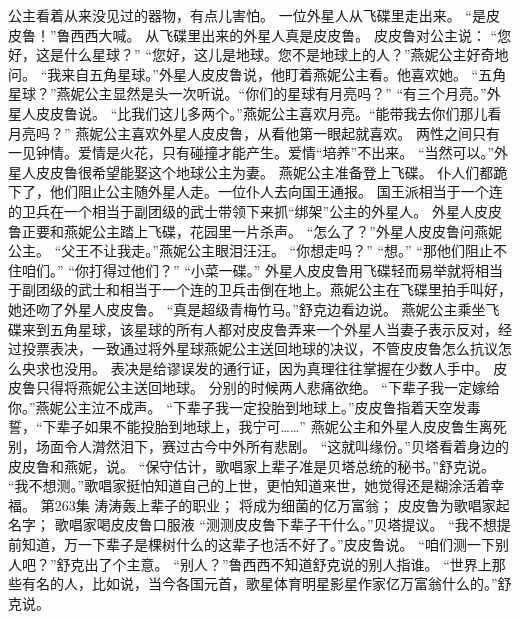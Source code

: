 \documentclass[a4paper,12pt,UTF8,twoside]{ctexbook}
\begin{document}
        公主看着从来没见过的器物，有点儿害怕。  
        一位外星人从飞碟里走出来。  
        “是皮皮鲁！”鲁西西大喊。  
        从飞碟里出来的外星人真是皮皮鲁。  
        皮皮鲁对公主说：  
        “您好，这是什么星球？”  
        “您好，这儿是地球。您不是地球上的人？”燕妮公主好奇地问。  
        “我来自五角星球。”外星人皮皮鲁说，他盯着燕妮公主看。他喜欢她。  
        “五角星球？”燕妮公主显然是头一次听说。“你们的星球有月亮吗？”  
        “有三个月亮。”外星人皮皮鲁说。  
        “比我们这儿多两个。”燕妮公主喜欢月亮。“能带我去你们那儿看月亮吗？”  
        燕妮公主喜欢外星人皮皮鲁，从看他第一眼起就喜欢。  
        两性之间只有一见钟情。爱情是火花，只有碰撞才能产生。爱情“培养”不出来。  
        “当然可以。”外星人皮皮鲁很希望能娶这个地球公主为妻。        
        燕妮公主准备登上飞碟。  
        仆人们都跪下了，他们阻止公主随外星人走。一位仆人去向国王通报。  
        国王派相当于一个连的卫兵在一个相当于副团级的武士带领下来抓“绑架”公主的外星人。  
        外星人皮皮鲁正要和燕妮公主踏上飞碟，花园里一片杀声。  
        “怎么了？”外星人皮皮鲁问燕妮公主。  
        “父王不让我走。”燕妮公主眼泪汪汪。  
        “你想走吗？”  
        “想。”  
        “那他们阻止不住咱们。”  
        “你打得过他们？”  
        “小菜一碟。”  
        外星人皮皮鲁用飞碟轻而易举就将相当于副团级的武士和相当于一个连的卫兵击倒在地上。燕妮公主在飞碟里拍手叫好，她还吻了外星人皮皮鲁。  
        “真是超级青梅竹马。”舒克边看边说。  
        燕妮公主乘坐飞碟来到五角星球，该星球的所有人都对皮皮鲁弄来一个外星人当妻子表示反对，经过投票表决，一致通过将外星球燕妮公主送回地球的决议，不管皮皮鲁怎么抗议怎么央求也没用。  
        表决是给谬误发的通行证，因为真理往往掌握在少数人手中。        
        皮皮鲁只得将燕妮公主送回地球。  
        分别的时候两人悲痛欲绝。  
        “下辈子我一定嫁给你。”燕妮公主泣不成声。  
        “下辈子我一定投胎到地球上。”皮皮鲁指着天空发毒誓，“下辈子如果不能投胎到地球上，我宁可……”  
        燕妮公主和外星人皮皮鲁生离死别，场面令人潸然泪下，赛过古今中外所有悲剧。  
        “这就叫缘份。”贝塔看着身边的皮皮鲁和燕妮，说。  
        “保守估计，歌唱家上辈子准是贝塔总统的秘书。”舒克说。  
        “我不想测。”歌唱家挺怕知道自己的上世，更怕知道来世，她觉得还是糊涂活着幸福。          第263集  
        涛涛轰上辈子的职业；  
        将成为细菌的亿万富翁；  
        皮皮鲁为歌唱家起名字；  
        歌唱家喝皮皮鲁口服液    
        “测测皮皮鲁下辈子干什么。”贝塔提议。  
        “我不想提前知道，万一下辈子是棵树什么的这辈子也活不好了。”皮皮鲁说。  
        “咱们测一下别人吧？”舒克出了个主意。  
        “别人？”鲁西西不知道舒克说的别人指谁。  
        “世界上那些有名的人，比如说，当今各国元首，歌星体育明星影星作家亿万富翁什么的。”舒克说。  
\end{document}
